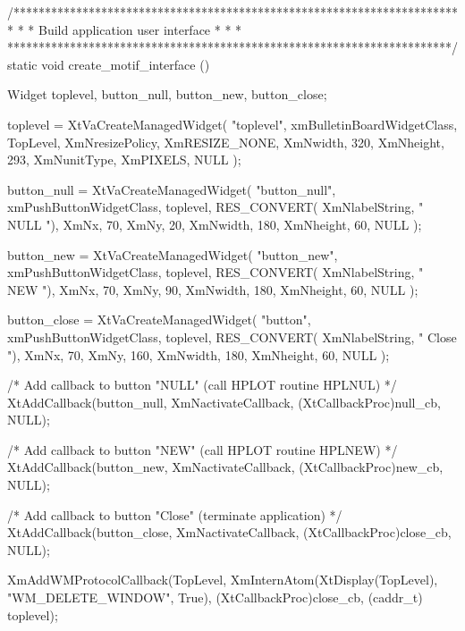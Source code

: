 /***********************************************************************
 *                                                                     *
 *   Build application user interface                                  *
 *                                                                     *
 ***********************************************************************/
static void create_motif_interface ()
{
   Widget toplevel, button_null, button_new, button_close;

   toplevel = XtVaCreateManagedWidget( "toplevel",
                        xmBulletinBoardWidgetClass,
                        TopLevel,
                        XmNresizePolicy, XmRESIZE_NONE,
                        XmNwidth, 320,
                        XmNheight, 293,
                        XmNunitType, XmPIXELS,
                        NULL );

   button_null = XtVaCreateManagedWidget( "button_null",
                        xmPushButtonWidgetClass,
                        toplevel,
                        RES_CONVERT( XmNlabelString, " NULL "),
                        XmNx, 70,
                        XmNy, 20,
                        XmNwidth, 180,
                        XmNheight, 60,
                        NULL );

   button_new = XtVaCreateManagedWidget( "button_new",
                        xmPushButtonWidgetClass,
                        toplevel,
                        RES_CONVERT( XmNlabelString, " NEW "),
                        XmNx, 70,
                        XmNy, 90,
                        XmNwidth, 180,
                        XmNheight, 60,
                        NULL );


   button_close = XtVaCreateManagedWidget( "button",
                        xmPushButtonWidgetClass,
                        toplevel,
                        RES_CONVERT( XmNlabelString, " Close "),
                        XmNx, 70,
                        XmNy, 160,
                        XmNwidth, 180,
                        XmNheight, 60,
                        NULL );

   /* Add callback to button "NULL" (call HPLOT routine HPLNUL) */
   XtAddCallback(button_null, XmNactivateCallback,
        (XtCallbackProc)null_cb,  NULL);

   /* Add callback to button "NEW" (call HPLOT routine HPLNEW) */
   XtAddCallback(button_new, XmNactivateCallback,
        (XtCallbackProc)new_cb,  NULL);

   /* Add callback to button "Close" (terminate application) */
   XtAddCallback(button_close, XmNactivateCallback,
        (XtCallbackProc)close_cb,  NULL);

   XmAddWMProtocolCallback(TopLevel,
        XmInternAtom(XtDisplay(TopLevel), "WM_DELETE_WINDOW", True),
        (XtCallbackProc)close_cb, (caddr_t) toplevel);
}

